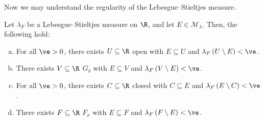 \documentclass[10pt]{mypackage}
\begin{document}
Now we may understand the regularity of the Lebesgue--Stieltjes measure.
\begin{theorem}
  Let $\lambda_F$ be a Lebesgue--Stieltjes measure on $\R$, and let $E\in \mathcal{M}_{\lambda}$. Then, the following hold:
  \begin{enumerate}[(a)]
    \item For all $\ve > 0$, there exists $U\subseteq \R$ open with $E\subseteq U$ and $\lambda_F\left( U\setminus E \right) < \ve$.
    \item There exists $V\subseteq \R$ $G_{\delta}$ with $E\subseteq V$ and $\lambda_F\left( V\setminus E \right) < \ve$.
    \item For all $\ve > 0$, there exists $C\subseteq \R$ closed with $C\subseteq E$ and $\lambda_F\left( E\setminus C \right) < \ve$.
    \item There exists $F\subseteq \R$ $F_{\sigma}$ with $E\subseteq F$ and $\lambda_F\left( F\setminus E \right) < \ve$.
  \end{enumerate}
\end{theorem}
\end{document}
